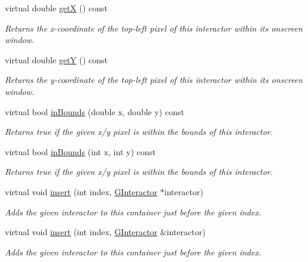 \begin{DoxyCompactItemize}
virtual double \mbox{\hyperlink{classGInteractor_a344385751bee0720059403940d57a13e}{getX}} () const
\begin{DoxyCompactList}\small\item\em Returns the x-\/coordinate of the top-\/left pixel of this interactor within its onscreen window. \end{DoxyCompactList}\item 
virtual double \mbox{\hyperlink{classGInteractor_aafa51c7f8f38a09febbb9ce7853f77b4}{getY}} () const
\begin{DoxyCompactList}\small\item\em Returns the y-\/coordinate of the top-\/left pixel of this interactor within its onscreen window. \end{DoxyCompactList}\item 
virtual bool \mbox{\hyperlink{classGInteractor_afc480f652b8c5f1fb255e2269ce68879}{in\+Bounds}} (double x, double y) const
\begin{DoxyCompactList}\small\item\em Returns true if the given x/y pixel is within the bounds of this interactor. \end{DoxyCompactList}\item 
virtual bool \mbox{\hyperlink{classGInteractor_ae6d7982c1c627b677a5e776ca86118ed}{in\+Bounds}} (int x, int y) const
\begin{DoxyCompactList}\small\item\em Returns true if the given x/y pixel is within the bounds of this interactor. \end{DoxyCompactList}\item 
virtual void \mbox{\hyperlink{classGContainer_afffb8f789ff9a8466fbae5b846a0ebe7}{insert}} (int index, \mbox{\hyperlink{classGInteractor}{G\+Interactor}} $\ast$interactor)
\begin{DoxyCompactList}\small\item\em Adds the given interactor to this container just before the given index. \end{DoxyCompactList}\item 
virtual void \mbox{\hyperlink{classGContainer_a2e9d7c6d9e6769d4cfd3293afe7e215c}{insert}} (int index, \mbox{\hyperlink{classGInteractor}{G\+Interactor}} \&interactor)
\begin{DoxyCompactList}\small\item\em Adds the given interactor to this container just before the given index. \end{DoxyCompactList}\item 

\end{DoxyCompactItemize}

